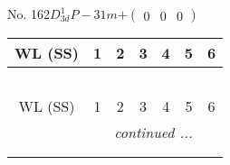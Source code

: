 \documentclass[fleqn,9pt,landscape]{jsarticle}
\begin{document}
\newpage
No. 162\quad$D_{3d}^{1}$\quad$P-31m$\quad[ trigonal ]\quad$+\begin{pmatrix} 0 & 0 & 0 \end{pmatrix}$
\begin{center}
\renewcommand{\arraystretch}{1.2}
\begin{longtable}{ccccccc}
 \hline \hline
WL (SS) & 1 & 2 & 3 & 4 & 5 & 6 \\ \hline \endfirsthead

\multicolumn{6}{l}{\tablename\ \thetable{}} \\
 \hline \hline
WL (SS) & 1 & 2 & 3 & 4 & 5 & 6 \\ \hline \endhead

 \hline \hline
\multicolumn{6}{r}{\footnotesize\it continued ...} \\ \endfoot

 \hline \hline
\multicolumn{6}{r}{} \\ \endlastfoot


\end{longtable}
\end{center}
\end{document}
